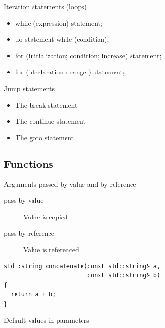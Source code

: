 \documentclass{beamer}
\begin{document}
\begin{frame}{Iteration statements (loops)}
\begin{itemize}
  \item while (expression) statement;
  \item do statement while (condition);
  \item for (initialization; condition; increase) statement;
  \item for ( declaration : range ) statement;
\end{itemize}
\end{frame}

\begin{frame}{Jump statements}
\begin{itemize}
  \item The break statement
  \item The continue statement
  \item The goto statement
\end{itemize}
\end{frame}

\subsection{Functions}
\begin{frame}

\end{frame}

\begin{frame}[fragile]{Arguments passed by value and by reference}
\begin{description}
\item[pass by value] Value is copied
\item[pass by reference] Value is referenced
\end{description}
\begin{lstlisting}[caption=Const reference parameter]
std::string concatenate(const std::string& a,
                        const std::string& b)
{
  return a + b;
}
\end{lstlisting}
\end{frame}

\begin{frame}[fragile]{Default values in parameters}

\end{frame}
\end{document}
